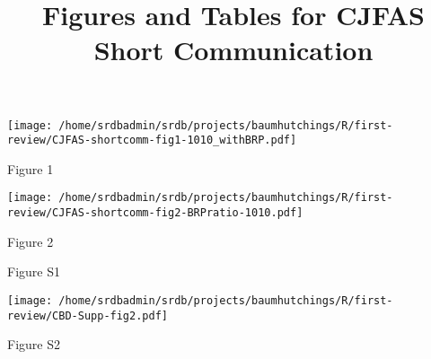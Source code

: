 \documentclass[letterpaper,12pt]{article}
\title{Figures and Tables for CJFAS Short Communication}
\begin{document}
\maketitle{}



\begin{center}
\texttt{[image: /home/srdbadmin/srdb/projects/baumhutchings/R/first-review/CJFAS-shortcomm-fig1-1010\_withBRP.pdf]}
\end{center}
\noindent 
Figure 1

\begin{center}
\texttt{[image: /home/srdbadmin/srdb/projects/baumhutchings/R/first-review/CJFAS-shortcomm-fig2-BRPratio-1010.pdf]}
\end{center}
\noindent 
Figure 2


\begin{tiny}
\begin{landscape}

\end{landscape}
\end{tiny}

\clearpage


\noindent 
Figure S1

\clearpage

\begin{center}
\texttt{[image: /home/srdbadmin/srdb/projects/baumhutchings/R/first-review/CBD-Supp-fig2.pdf]}
\end{center}
\noindent 
Figure S2
\end{document}
